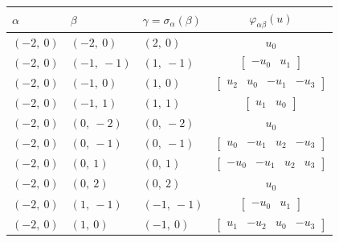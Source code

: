 \documentclass[11pt]{article}
\newcommand{\noi}{\noindent}
\theoremstyle{definition}
\begin{document}
\noi \noindent \begin{longtable}{|l|l|l|c|}
    \hline
    \textbf{$\alpha$} & \textbf{$\beta$} & \textbf{$\gamma = \sigma_{\alpha}(\beta)$} & $\varphi_{\alpha\beta}(u)$ \\
    \hline
    \endhead
    $\left( -2, \  0\right)$ & $\left( -2, \  0\right)$ & $\left( 2, \  0\right)$ & $u_{0}$ \\
    \hline
    $\left( -2, \  0\right)$ & $\left( -1, \  -1\right)$ & $\left( 1, \  -1\right)$ & $\left[\begin{matrix}- u_{0} & u_{1}\end{matrix}\right]$ \\
    \hline
    $\left( -2, \  0\right)$ & $\left( -1, \  0\right)$ & $\left( 1, \  0\right)$ & $\left[\begin{matrix}u_{2} & u_{0} & - u_{1} & - u_{3}\end{matrix}\right]$ \\
    \hline
    $\left( -2, \  0\right)$ & $\left( -1, \  1\right)$ & $\left( 1, \  1\right)$ & $\left[\begin{matrix}u_{1} & u_{0}\end{matrix}\right]$ \\
    \hline
    $\left( -2, \  0\right)$ & $\left( 0, \  -2\right)$ & $\left( 0, \  -2\right)$ & $u_{0}$ \\
    \hline
    $\left( -2, \  0\right)$ & $\left( 0, \  -1\right)$ & $\left( 0, \  -1\right)$ & $\left[\begin{matrix}u_{0} & - u_{1} & u_{2} & - u_{3}\end{matrix}\right]$ \\
    \hline
    $\left( -2, \  0\right)$ & $\left( 0, \  1\right)$ & $\left( 0, \  1\right)$ & $\left[\begin{matrix}- u_{0} & - u_{1} & u_{2} & u_{3}\end{matrix}\right]$ \\
    \hline
    $\left( -2, \  0\right)$ & $\left( 0, \  2\right)$ & $\left( 0, \  2\right)$ & $u_{0}$ \\
    \hline
    $\left( -2, \  0\right)$ & $\left( 1, \  -1\right)$ & $\left( -1, \  -1\right)$ & $\left[\begin{matrix}- u_{0} & u_{1}\end{matrix}\right]$ \\
    \hline
    $\left( -2, \  0\right)$ & $\left( 1, \  0\right)$ & $\left( -1, \  0\right)$ & $\left[\begin{matrix}u_{1} & - u_{2} & u_{0} & - u_{3}\end{matrix}\right]$ \\

\end{longtable}
\end{document}
